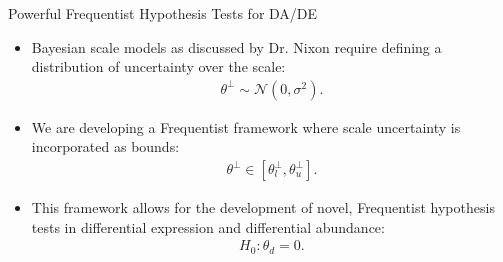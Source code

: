 \documentclass{beamer}
\begin{document}
\begin{frame}[label={sec:org4ec3de6}]{Powerful Frequentist Hypothesis Tests for DA/DE}
  \begin{itemize}
  \item Bayesian scale models as discussed by Dr. Nixon require defining a distribution of uncertainty over the scale:
    \begin{align*}
      \theta^\perp \sim \mathcal{N}(0, \sigma^2).
    \end{align*}

\item We are developing a Frequentist framework where scale uncertainty is incorporated as bounds:
  \begin{align*}
    \theta ^\perp \in [\theta^\perp_l, \theta^\perp_u].
  \end{align*}

\item This framework allows for the development of novel, Frequentist hypothesis tests in differential expression and differential abundance:
  \begin{align*}
    H_0: \theta_d = 0.
  \end{align*}
 \end{itemize} 
\end{frame}
\end{document}
